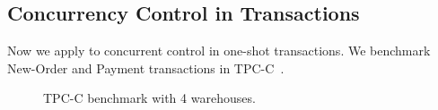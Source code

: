 \subsection{Concurrency Control in Transactions}
\label{subsec:eval-transactions}

Now we apply \sys to concurrent control in one-shot transactions.
We benchmark New-Order and Payment transactions in TPC-C~\cite{tpcc}.


\begin{figure}[t]
\centering
	\hspace{0.02\textwidth}
    \hspace{0.02\textwidth}
\caption{TPC-C benchmark with 4 warehouses.}
\label{fig:tpc-c}
\end{figure}

